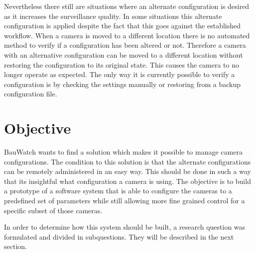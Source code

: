 Nevertheless there still are situations where an alternate configuration is desired as it increases the surveillance quality.
In some situations this alternate configuration is applied despite the fact that this goes against the established workflow.
When a camera is moved to a different location there is no automated method to verify if a configuration has been altered or not.
Therefore a camera with an alternative configuration can be moved to a different location without restoring the configuration to its original state.
This causes the camera to no longer operate as expected.
The only way it is currently possible to verify a configuration is by checking the settings manually or restoring from a backup configuration file.


\section{Objective}
BauWatch wants to find a solution which makes it possible to manage camera configurations.
The condition to this solution is that the alternate configurations can be remotely administered in an easy way.
This should be done in such a way that its insightful what configuration a camera is using.
The objective is to build a prototype of a software system that is able to configure the cameras to a predefined set of parameters while still allowing
more fine grained control for a specific subset of those cameras.

In order to determine how this system should be built, a research question was formulated and divided in subquestions. They will be described in the next section.



